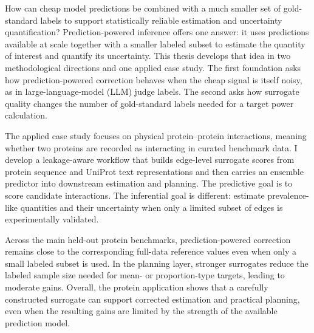 

How can cheap model predictions be combined with a much smaller set of gold-standard labels to support statistically reliable estimation and uncertainty quantification? Prediction-powered inference offers one answer: it uses predictions available at scale together with a smaller labeled subset to estimate the quantity of interest and quantify its uncertainty. This thesis develops that idea in two methodological directions and one applied case study. The first foundation asks how prediction-powered correction behaves when the cheap signal is itself noisy, as in large-language-model (LLM) judge labels. The second asks how surrogate quality changes the number of gold-standard labels needed for a target power calculation.

The applied case study focuses on physical protein--protein interactions, meaning whether two proteins are recorded as interacting in curated benchmark data. I develop a leakage-aware workflow that builds edge-level surrogate scores from protein sequence and UniProt text representations and then carries an ensemble predictor into downstream estimation and planning. The predictive goal is to score candidate interactions. The inferential goal is different: estimate prevalence-like quantities and their uncertainty when only a limited subset of edges is experimentally validated.

Across the main held-out protein benchmarks, prediction-powered correction remains close to the corresponding full-data reference values even when only a small labeled subset is used. In the planning layer, stronger surrogates reduce the labeled sample size needed for mean- or proportion-type targets, leading to moderate gains. Overall, the protein application shows that a carefully constructed surrogate can support corrected estimation and practical planning, even when the resulting gains are limited by the strength of the available prediction model.

\par\medskip




